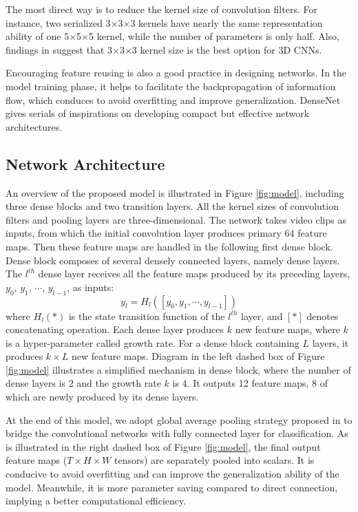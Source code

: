 \documentclass[10pt,twocolumn,letterpaper]{article}
\begin{document}
The most direct way is to reduce the kernel size of convolution filters. 
For instance, two serialized 3$\times$3$\times$3 kernels have nearly the same representation ability of one 5$\times$5$\times$5 kernel, while the number of parameters is only half. 
Also, findings in \cite{3dcnn_1, 3dcnn_2, r2+1d} suggest that 3$\times$3$\times$3 kernel size is the best option for 3D CNNs.

Encouraging feature reusing is also a good practice in designing networks. 
In the model training phase, it helps to facilitate the backpropagation of information flow, which conduces to avoid overfitting and improve generalization. 
DenseNet \cite{densenet} gives serials of inspirations on developing compact but effective network architectures.

\subsection{Network Architecture}

An overview of the proposed model is illustrated in Figure \ref{fig:model}, including three dense blocks and two transition layers. 
All the kernel sizes of convolution filters and pooling layers are three-dimensional. 
The network takes video clips as inputs, from which the initial convolution layer produces primary 64 feature maps. 
Then these feature maps are handled in the following first dense block. 
Dense block composes of several densely connected layers, namely dense layers.
The $l^{th}$ dense layer receives all the feature maps produced by its preceding layers, $y_0$, $y_1$, $\cdots$, $y_{l-1}$, as inputs:
\begin{equation}
\label{eq:densenet}
y_l = H_l\left([y_0, y_1, \cdots, y_{l-1}]\right)
\end{equation}
where $H_l(*)$ is the state transition function of the $l^{th}$ layer, and $[*]$ denotes concatenating operation.
Each dense layer produces $k$ new feature maps, where $k$ is a hyper-parameter called growth rate. 
For a dense block containing $L$ layers, it produces $k \times L$ new feature maps.
Diagram in the left dashed box of Figure \ref{fig:model} illustrates a simplified mechanism in dense block, where the number of dense layers is 2 and the growth rate $k$ is 4.
It outputs 12 feature maps, 8 of which are newly produced by its dense layers.

At the end of this model, we adopt global average pooling strategy proposed in \cite{NinN} to bridge the convolutional networks with fully connected layer for classification.
As is illustrated in the right dashed box of Figure \ref{fig:model}, the final output feature maps ($T \times H \times W$ tensors) are separately pooled into scalars.
It is conducive to avoid overfitting and can improve the generalization ability of the model. 
Meanwhile, it is more parameter saving compared to direct connection, implying a better computational efficiency.
\end{document}
